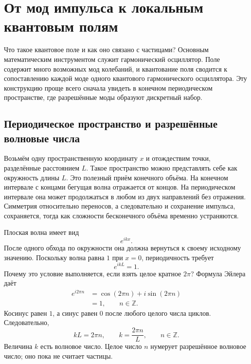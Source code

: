 \chapter{От мод импульса к локальным квантовым полям}

Что такое квантовое поле и как оно связано с частицами? Основным математическим инструментом служит гармонический осциллятор. Поле содержит много возможных мод колебаний, и квантование поля сводится к сопоставлению каждой моде одного квантового гармонического осциллятора. Эту конструкцию проще всего сначала увидеть в конечном периодическом пространстве, где разрешённые моды образуют дискретный набор.

\section{Периодическое пространство и разрешённые волновые числа}

Возьмём одну пространственную координату \(x\) и отождествим точки, разделённые расстоянием \(L\). Такое пространство можно представлять себе как окружность длины \(L\). Это полезный приём конечного объёма. На конечном интервале с концами бегущая волна отражается от концов. На периодическом интервале она может продолжаться в любом из двух направлений без отражения. Симметрия относительно переносов, а следовательно и сохранение импульса, сохраняется, тогда как сложности бесконечного объёма временно устраняются.

Плоская волна имеет вид
\begin{equation}
e^{ikx}.
\end{equation}
После одного обхода по окружности она должна вернуться к своему исходному значению. Поскольку волна равна \(1\) при \(x=0\), периодичность требует
\begin{equation}
e^{ikL}=1.
\end{equation}
Почему это условие выполняется, если взять целое кратное \(2\pi\)? Формула Эйлера даёт
\begin{align}
e^{i2\pi n}
&=\cos(2\pi n)+i\sin(2\pi n)\\
&=1,
\qquad n\in\mathbb Z.
\end{align}
Косинус равен \(1\), а синус равен \(0\) после любого целого числа циклов. Следовательно,
\begin{equation}
kL=2\pi n,
\qquad
k=\frac{2\pi n}{L},
\qquad n\in\mathbb Z.
\end{equation}
Величина \(k\) есть волновое число. Целое число \(n\) нумерует разрешённое волновое число; оно пока не считает частицы.

